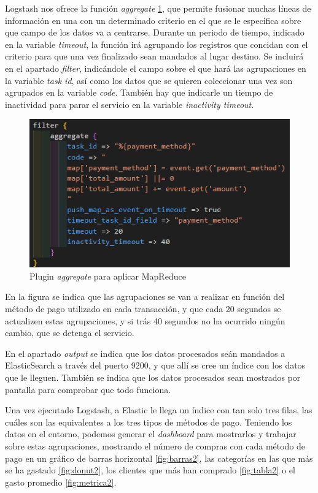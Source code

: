 Logstash nos ofrece la función \textit{aggregate} \ref{fig:aggregate}, que permite fusionar muchas líneas de información en una con un determinado criterio en el que se le especifica sobre que campo de los datos va a centrarse. Durante un periodo de tiempo, indicado en la variable \textit{timeout}, la función irá agrupando los registros que concidan con el criterio para que una vez finalizado sean mandados al lugar destino. Se incluirá en el apartado \textit{filter},  indicándole el campo sobre el que hará las agrupaciones en la variable \textit{task id}, así como los datos que se quieren coleccionar una vez son agrupados en la variable \textit{code}. También hay que indicarle un tiempo de inactividad para parar el servicio en la variable \textit{inactivity timeout}.
\begin{figure}
    \centering
    \includegraphics[width=1\linewidth]{img/aggregate.png}
    \caption{Plugin \textit{aggregate} para aplicar MapReduce}
    \label{fig:aggregate}
\end{figure}

En la figura se indica que las agrupaciones se van a realizar en función del método de pago utilizado en cada transacción, y que cada 20 segundos se actualizen estas agrupaciones, y si trás 40 segundos no ha ocurrido ningún cambio, que se detenga el servicio.

En el apartado \textit{output} se indica que los datos procesados seán mandados a ElasticSearch a través del puerto 9200, y que allí se cree un índice con los datos que le lleguen. También se indica que los datos procesados sean mostrados por pantalla para comprobar que todo funciona.

Una vez ejecutado Logstash, a Elastic le llega un índice con tan solo tres filas, las cuáles son las equivalentes a los tres tipos de métodos de pago. Teniendo los datos en el entorno, podemos generar el \textit{dashboard} para mostrarlos y trabajar sobre estas agrupaciones, mostrando el número de compras con cada método de pago en un gráfico de barras horizontal \ref{fig:barras2}, las categorías en las que más se ha gastado \ref{fig:donut2}, los clientes que más han comprado \ref{fig:tabla2} o el gasto promedio \ref{fig:metrica2}.


